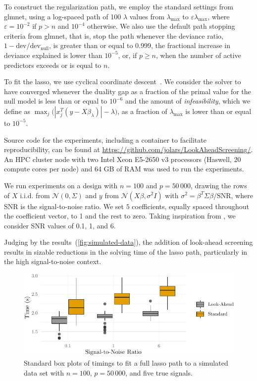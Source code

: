\documentclass[b5paper,10pt,abstractoff,DIV=calc,headings=normal,twoside]{scrartcl}
\theoremstyle{plain}
\theoremstyle{definition}
\theoremstyle{remark}
\begin{document}
To construct
the regularization path, we employ the standard settings from \textsf{glmnet},
using a log-spaced path of 100 \(\lambda\) values from \(\lambda_\text{max}\)
to \(\varepsilon \lambda_\text{max}\), where \(\varepsilon = 10^{-2}\) if
\(p > n\) and \(10^{-4}\) otherwise. We also use the default
path stopping criteria from \textsf{glmnet}, that is, stop the path whenever
the deviance ratio, \(1 - \text{dev}/\text{dev}_\text{null}\),
is greater than or equal to 0.999,
the fractional increase in deviance explained is lower than
\(10^{-5}\), or, if \(p \geq n\),
when the number of active predictors exceeds or is equal to
\(n\).

To fit the lasso, we
use cyclical coordinate descent~\cite{friedman2010}.
We consider the solver to have converged whenever
the duality gap as a fraction of the primal value
for the null model is less than or equal to \(10^{-6}\) and the amount of
\emph{infeasibility}, which we define as
\(\max_j\big( |x_j^T(y - X\beta_\lambda)| -\lambda\big)\), as a
fraction of \(\lambda_\text{max}\) is lower than or
equal to \(10^{-5}\).

Source code for the experiments, including a container to facilitate
reproducibility, can be found at
\url{https://github.com/jolars/LookAheadScreening/}. An HPC
cluster node with two Intel Xeon E5-2650 v3 processors (Haswell, 20 compute
cores per node) and 64 GB of RAM was used to run the experiments.

We run experiments on a design with \(n = 100\) and \(p = 50\,000\),
drawing the rows of \(X\) i.i.d. from \(\mathcal{N}(0, \Sigma)\) and \(y\)
from \(\mathcal{N}(X\beta, \sigma^2I)\) with \(\sigma^2 =
\beta^T\Sigma\beta/\text{SNR}\), where SNR is the signal-to-noise ratio.  We set
\(5\) coefficients, equally spaced throughout the coefficient vector, to 1 and
the rest to zero. Taking inspiration from \citet{hastie2020}, we
consider SNR values of 0.1, 1, and 6.

Judging by the results~(\autoref{fig:simulated-data}), the addition of
look-ahead screening results in sizable reductions in the solving time of
the lasso path, particularly in the high signal-to-noise context.

\begin{figure}[hbtp]
  \centering
  \includegraphics{figures/simulateddata-timings.pdf}
  \caption{Standard box plots of timings to fit a full lasso path to
    a simulated data set with \(n = 100\), \(p = 50\,000\), and five true
    signals.}
  \label{fig:simulated-data}
\end{figure}
\end{document}
